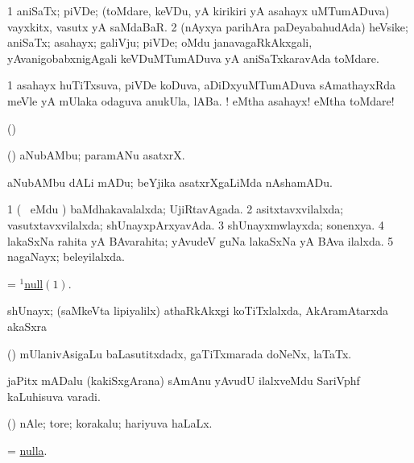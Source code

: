 \bentry
{}
\gl{\nA}
\bmng
\bnum
\num{1} aniSaTx; piVDe; (toMdare, keVDu, yA kirikiri yA asahayx uMTumADuva) vayxkitx, vasutx yA saMdaBaR. 
\num{2} (nAyxya parihAra paDeyabahudAda) heVsike; aniSaTx; asahayx; galiVju; piVDe; oMdu janavagaRkAkxgali, yAvanigobabxnigAgali keVDuMTumADuva yA aniSaTxkaravAda toMdare. 
\enum
\emng

\noindent
\gl{\pagu}
\bmng
\bnum
\num{1}  asahayx huTiTxsuva, piVDe koDuva, aDiDxyuMTumADuva sAmathayxRda meVle yA mUlaka odaguva anukUla, lABa. 
 ! 
\banum
{} eMtha asahayx! 
 eMtha toMdare! 
\eanum
\numie
\enum
\emng
\eentry

\bentry
{}
\gl{\saMkiSx}
\bmng
(\birx)  
\emng
\eentry

\bentry
{}
\gl{\nA}
\bmng
(\AmA) aNubAMbu; paramANu asatxrX. 
\emng
\eentry

\bentry
{}
\gl{\gu}
\bmng
aNubAMbu dALi mADu; beYjika asatxrXgaLiMda nAshamADu. 
\emng
\eentry

\bentry
{}
\gl{\gu}
\bmng
\bnum
\num{1} (\kanmu\  eMdu \parx) baMdhakavalalxda; UjiRtavAgada. 
\num{2} asitxtavxvilalxda; vasutxtavxvilalxda; shUnayxpArxyavAda. 
\num{3} shUnayxmwlayxda; sonenxya. 
\num{4} lakaSxNa rahita yA BAvarahita; yAvudeV guNa lakaSxNa yA BAva ilalxda. 
\num{5} nagaNayx; beleyilalxda. 
\enum
\emng

\noindent
\gl{\pagu}
\bmng
{} = \hyperlink{null(1)}{$^1$null\((1)\)}. 
\emng
\eentry

\bentry
{}
\gl{\nA}
\bmng
shUnayx; (saMkeVta lipiyalilx) athaRkAkxgi koTiTxlalxda, AkAramAtarxda akaSxra  
\emng
\eentry

\bentry
{}
\gl{\nA}
\bmng
(\AseTxrXV) mUlanivAsigaLu baLasutitxdadx, gaTiTxmarada doNeNx, laTaTx. 
\emng
\eentry

\bentry
{}
\gl{\nA}
\expl{\Latin}
\bmng
jaPitx mADalu (kakiSxgArana) sAmAnu yAvudU ilalxveMdu SariVphf kaLuhisuva varadi. 
\emng
\eentry

\bentry
{}
\gl{\nA}
\bmng
(\AMiM) nAle; tore; korakalu; hariyuva haLaLx. 
\emng
\eentry

\bentry
{}
\gl{\nA}
\bmng
= \hyperlink{nulla}{nulla}. 
\emng
\eentry

